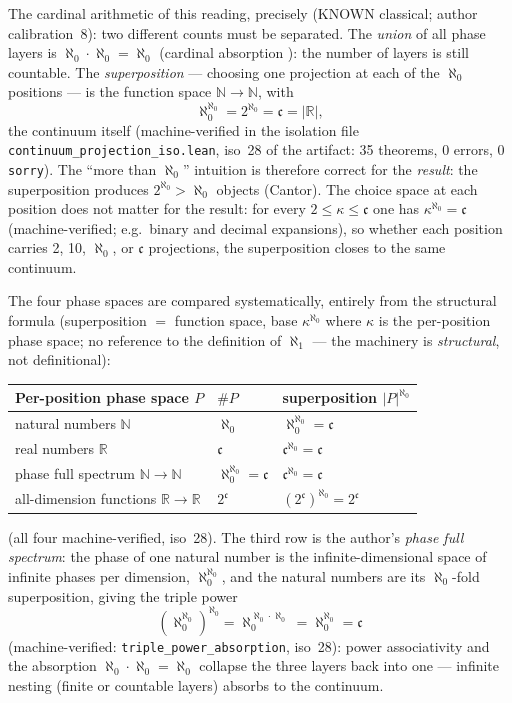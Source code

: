 \documentclass{article}
\begin{document}
The cardinal arithmetic of this reading, precisely (KNOWN
classical; author calibration~8): two different
counts must be separated. The \emph{union} of all phase layers is
$\aleph_0\cdot\aleph_0=\aleph_0$ (cardinal absorption \cite{halmos}): the number of
layers is still countable. The \emph{superposition} --- choosing one
projection at each of the $\aleph_0$ positions --- is the function space
$\mathbb{N}\to\mathbb{N}$, with
\[
\aleph_0^{\aleph_0}=2^{\aleph_0}=\mathfrak c=|\mathbb{R}|,
\]
the continuum itself (machine-verified in the isolation file
\texttt{continuum\_projection\_iso.lean}, iso~28 of the artifact: 35
theorems, 0 errors, 0 \texttt{sorry}). The ``more than $\aleph_0$''
intuition is therefore correct for the \emph{result}: the superposition
produces $2^{\aleph_0}>\aleph_0$ objects (Cantor). The choice space at
each position does not matter for the result: for every
$2\le\kappa\le\mathfrak c$ one has $\kappa^{\aleph_0}=\mathfrak c$
(machine-verified; e.g.\ binary and decimal expansions), so whether each
position carries 2, 10, $\aleph_0$, or $\mathfrak c$ projections, the
superposition closes to the same continuum.

The four phase spaces are compared systematically, entirely from the
structural formula (superposition $=$ function space, base
$\kappa^{\aleph_0}$ where $\kappa$ is the per-position phase space; no
reference to the definition of $\aleph_1$ --- the machinery is
\emph{structural}, not definitional):

\begin{center}
\small
\begin{tabular}{lll}
\hline
Per-position phase space $P$ & $\#P$ & superposition $|P|^{\aleph_0}$ \\
\hline
natural numbers $\mathbb N$ & $\aleph_0$ & $\aleph_0^{\aleph_0}=\mathfrak c$ \\
real numbers $\mathbb R$ & $\mathfrak c$ & $\mathfrak c^{\aleph_0}=\mathfrak c$ \\
phase full spectrum $\mathbb N\to\mathbb N$ &
$\aleph_0^{\aleph_0}=\mathfrak c$ & $\mathfrak c^{\aleph_0}=\mathfrak c$ \\
all-dimension functions $\mathbb R\to\mathbb R$ & $2^{\mathfrak c}$ &
$(2^{\mathfrak c})^{\aleph_0}=2^{\mathfrak c}$ \\
\hline
\end{tabular}
\end{center}

(all four machine-verified, iso~28). The third row is the author's
\emph{phase full spectrum}: the phase of one natural number is the
infinite-dimensional space of infinite phases per dimension,
$\aleph_0^{\aleph_0}$, and the natural numbers are its
$\aleph_0$-fold superposition, giving the triple power
\[
(\aleph_0^{\aleph_0})^{\aleph_0}
=\aleph_0^{\aleph_0\cdot\aleph_0}
=\aleph_0^{\aleph_0}
=\mathfrak c
\]
(machine-verified: \texttt{triple\_power\_absorption}, iso~28): power
associativity and the absorption $\aleph_0\cdot\aleph_0=\aleph_0$
collapse the three layers back into one --- infinite nesting (finite or
countable layers) absorbs to the continuum.
\end{document}

